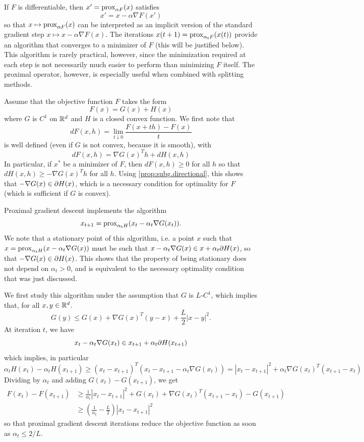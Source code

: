 If $F$ is differentiable, then 
$x' = \operatorname{prox}_{\alpha F}(x)$ satisfies 
\[
x' = x - \alpha \nabla F(x')
\]
so that $x \mapsto \operatorname{prox}_{\alpha F}(x)$ can be interpreted as an implicit version of the standard gradient step  $x \mapsto x - \alpha \nabla F(x)$. The iterations $x(t+1) = \operatorname{prox}_{\alpha_t F} (x(t))$ provide an algorithm that converges to a minimizer of $F$ (this will be justified below). This algorithm is rarely practical, however, since the minimization required at each step is not necessarily much easier to perform than minimizing $F$ itself. The proximal operator, however, is especially useful when  combined with splitting methods.

\bigskip

Assume that the objective function $F$ takes the form
\begin{equation}
\label{eq:split.1}
F(x) = G(x) + H(x)
\end{equation}
where $G$ is $C^1$ on ${\mathbb{R}}^d$ and $H$ is a closed convex function. We first note that 
\[
dF(x, h) = \lim_{t\downarrow 0} \frac{F(x+th)-F(x)}{t}
\]
is well defined (even if $G$ is not convex, because it is smooth), with
\[
dF(x,h) = \nabla G(x)^T h + dH(x,h)
\]
In particular, if  $x^*$ be a minimizer of $F$, then $dF(x,h) \geq 0$ for all $h$ so that $dH(x,h) \geq -\nabla G(x)^T h$ for all $h$. Using \cref{prop:subg.directional}, this shows that $-\nabla G(x) \in \partial H(x)$, which is a necessary condition for optimality for $F$ (which is sufficient if $G$ is convex).


Proximal gradient descent implements the algorithm
\begin{equation}
\label{eq:prox.grad}
x_{t+1} = \operatorname{prox}_{\alpha_t H} (x_t - \alpha_t \nabla G(x_t)).
\end{equation}
We note that a stationary point of this algorithm, i.e. a point $x$ such that $x = \operatorname{prox}_{\alpha_t H} (x - \alpha_t \nabla G(x))$ must be such that $x-\alpha_t \nabla G(x) \in x + \alpha_t \partial H(x)$, so that $-\nabla G(x) \in \partial H(x)$. This shows that the property of being stationary does not depend on $\alpha_t >0$, and is equivalent to the necessary optimality condition that was just discussed.

We first study this algorithm under the assumption that $G$ is $L$-$C^1$, which implies that, for all $x,y\in {\mathbb{R}}^d$. 
\[
G(y) \leq G(x) + \nabla G(x)^T(y-x) + \frac{L}{2} |x-y|^2.
\]
At iteration $t$, we have
\[
x_{t} - \alpha_t \nabla G(x_t) \in x_{t+1} + \alpha_t \partial H(x_{t+1})
\]
which implies, in particular
\[
\alpha_t H(x_t) - \alpha_t H(x_{t+1}) \geq (x_t - x_{t+1} )^T (x_{t} - x_{t+1} - \alpha_t \nabla G(x_t)) = |x_t - x_{t+1}|^2  + \alpha_t \nabla G(x_t)^T(x_{t+1} - x_t)
\]
Dividing by $\alpha_t$ and adding $G(x_t) - G(x_{t+1})$, we get
\begin{align}
\nonumber
F(x_t) - F(x_{t+1}) &\geq \frac{1}{\alpha_t} |x_t - x_{t+1}|^2 + G(x_t) + \nabla G(x_t)^T(x_{t+1} - x_t) - G(x_{t+1})\\
\label{eq:prox.grad.conv.1}
& \geq \left(\frac{1}{\alpha_t} - \frac{L}{2}\right) |x_t - x_{t+1}|^2
\end{align}
so that proximal gradient descent iterations reduce the objective function as soon as $\alpha_t \leq 2/L$. 

